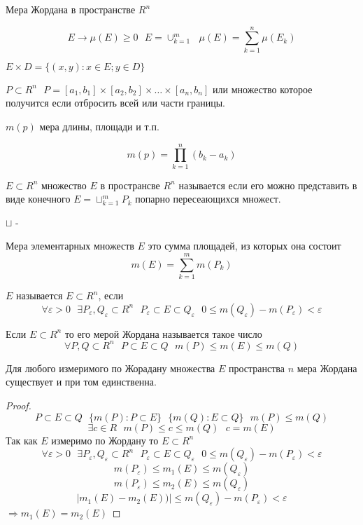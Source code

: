 \begin{title}[\Large]
  Мера Жордана в пространстве $R^n$
\end{title}

  $$
  E \to \mu (E) \ge 0 ~~~
  E = \cup_{k=1}^m ~~~
  \mu(E) = \sum_{k=1}^n \mu (E_k)
  $$

   $E \times D = \{ (x,y): x \in E; y \in D \}$

  $P \subset R^n ~~~ P = [a_1, b_1] \times [a_2, b_2] \times \ldots \times
  [a_n, b_n]$ или множество которое получится если отбросить всей или части
  границы.

  $m(p)$ мера длины, площади и т.п.

  $$
  m(p) = \prod_{k=1}^n (b_k - a_k)
  $$

  $E \subset R^n$ множество $E$ в пространсве $R^n$ называется 
  если его можно представить в виде конечного $E = \sqcup_{k=1}^m P_k$ попарно
  пересеающихся множест.

  $\sqcup$ - 

Мера элементарных множеств $E$ это сумма площадей, из которых она состоит
$$
m(E) = \sum_{k=1}^m m(P_k)
$$

\begin{defin}
  $E$ называется  $E \subset R^n$, если
  $$
  \forall \varepsilon > 0 ~~~
  \exists P_{\varepsilon}, Q_{\varepsilon} \subset R^n ~~~
  P_{\varepsilon} \subset E \subset Q_{\varepsilon} ~~~
  0 \le m(Q_{\varepsilon}) - m(P_{\varepsilon}) < \varepsilon
  $$

  Если $E \subset R^n$ то его мерой Жордана называется такое число
  $$
  \forall P,Q \subset R^n ~~~
  P \subset E \subset Q ~~~
  m(P) \le m(E) \le m(Q)
  $$
\end{defin}

\begin{theorem}
  Для любого измеримого по Жорадану множества $E$ пространства $n$ мера Жордана
существует и при том единственна.
\end{theorem}

\begin{proof}
  $$
  P \subset E \subset Q ~~~
  \{ m(P): P \subset E \} ~~~
  \{ m(Q): E \subset Q \} ~~~
  m(P) \le m(Q)
  $$
  $$
  \exists c \in R ~~~
  m(P) \le c \le m(Q) ~~~
  c = m(E)
  $$
  Так как $E$ измеримо по Жордану то $E \subset R^n$
  $$
  \forall \varepsilon > 0 ~~~
  \exists P_{\varepsilon},Q_{\varepsilon} \subset R^n ~~~
  P_{\varepsilon} \subset E \subset Q_{\varepsilon} ~~~
  0 \le m(Q_{\varepsilon}) - m(P_\varepsilon) < \varepsilon
  $$
  $$
  m(P_{\varepsilon}) \le m_1 (E) \le m(Q_{\varepsilon})
  $$
  $$
  m(P_{\varepsilon}) \le m_2 (E) \le m(Q_{\varepsilon})
  $$
  $$
  |m_1 (E) - m_2 (E))| \le m(Q_{\varepsilon}) - m(P_{\varepsilon}) < \varepsilon
  $$
  $\Rightarrow m_1(E) = m_2(E)$
\end{proof}

